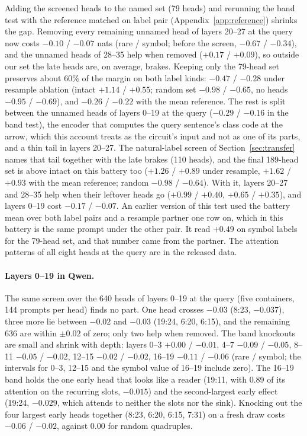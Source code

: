 \documentclass{article}
\begin{document}
Adding the screened heads to the named set (79 heads) and rerunning the band test with the reference matched on label pair (Appendix~\ref{app:reference}) shrinks the gap. Removing every remaining unnamed head of layers 20--27 at the query now costs $-0.10$ / $-0.07$ nats (rare / symbol; before the screen, $-0.67$ / $-0.34$), and the unnamed heads of 28--35 help when removed ($+0.17$ / $+0.09$), so outside our set the late heads are, on average, brakes. Keeping only the 79-head set preserves about 60\% of the margin on both label kinds: $-0.47$ / $-0.28$ under resample ablation (intact $+1.14$ / $+0.55$; random set $-0.98$ / $-0.65$, no heads $-0.95$ / $-0.69$), and $-0.26$ / $-0.22$ with the mean reference. The rest is split between the unnamed heads of layers 0--19 at the query ($-0.29$ / $-0.16$ in the band test), the encoder that computes the query sentence's class code at the arrow, which this account treats as the circuit's input and not as one of its parts, and a thin tail in layers 20--27. The natural-label screen of Section~\ref{sec:transfer} names that tail together with the late brakes (110 heads), and the final 189-head set is above intact on this battery too ($+1.26$ / $+0.89$ under resample, $+1.62$ / $+0.93$ with the mean reference; random $-0.98$ / $-0.64$). With it, layers 20--27 and 28--35 help when their leftover heads go ($+0.99$ / $+0.40$, $+0.65$ / $+0.35$), and layers 0--19 cost $-0.17$ / $-0.07$. An earlier version of this test used the battery mean over both label pairs and a resample partner one row on, which in this battery is the same prompt under the other pair. It read $+0.49$ on symbol labels for the 79-head set, and that number came from the partner. The attention patterns of all eight heads at the query are in the released data.

\paragraph{Layers 0--19 in Qwen.} The same screen over the 640 heads of layers 0--19 at the query (five containers, 144 prompts per head) finds no part. One head crosses $-0.03$ (8:23, $-0.037$), three more lie between $-0.02$ and $-0.03$ (19:24, 6:20, 6:15), and the remaining 636 are within $\pm0.02$ of zero; only two help when removed. The band knockouts are small and shrink with depth: layers 0--3 $+0.00$ / $-0.01$, 4--7 $-0.09$ / $-0.05$, 8--11 $-0.05$ / $-0.02$, 12--15 $-0.02$ / $-0.02$, 16--19 $-0.11$ / $-0.06$ (rare / symbol; the intervals for 0--3, 12--15 and the symbol value of 16--19 include zero). The 16--19 band holds the one early head that looks like a reader (19:11, with 0.89 of its attention on the recurring slots, $-0.015$) and the second-largest early effect (19:24, $-0.029$, which attends to neither the slots nor the sink). Knocking out the four largest early heads together (8:23, 6:20, 6:15, 7:31) on a fresh draw costs $-0.06$ / $-0.02$, against $0.00$ for random quadruples.
\end{document}
